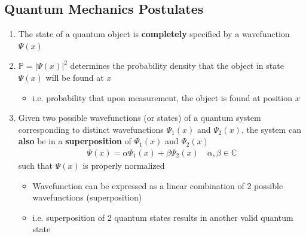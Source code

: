 \documentclass[a4paper,12pt]{article}
\begin{document}
\subsection{Quantum Mechanics Postulates}
\begin{enumerate}
  \item The state of a quantum object is \textbf{completely} specified by a wavefunction $\Psi(x)$
  \item $\mathbb{P} = |\Psi(x)|^2$ determines the probability density that the object in state $\Psi(x)$ will be found at $x$
  \begin{itemize}
    \item i.e. probability that upon measurement, the object is found at position $x$
  \end{itemize}
  \item Given two possible wavefunctions (or states) of a quantum system corresponding to distinct wavefunctions $\Psi_1(x)$ and $\Psi_2(x)$, the system can \textbf{also} be in a \textbf{superposition} of $\Psi_1(x)$ and $\Psi_2(x)$
  \begin{align}
    \Psi(x) = \alpha\Psi_1(x) + \beta\Psi_2(x) \quad \alpha, \beta \in \mathbb{C}
  \end{align}
  such that $\Psi(x)$ is properly normalized
  \begin{itemize}
    \item Wavefunction can be expressed as a linear combination of 2 possible wavefunctions (superposition)
    \item i.e. superposition of 2 quantum states results in another valid quantum state
  \end{itemize}
\end{enumerate}
\end{document}
